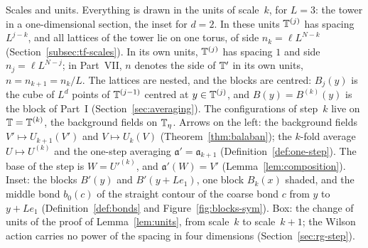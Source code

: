 \begin{gfigure}[tp]
\caption{Scales and units. Everything is drawn in the units of scale~$k$, for $L=3$: the tower in a one-dimensional section, the inset for $d=2$. In these units $\T^{(j)}$ has spacing $L^{j-k}$, and all lattices of the tower lie on one torus, of side $n_k=\ell L^{N-k}$ (Section~\ref{subsec:tf-scales}). In its own units, $\T^{(j)}$ has spacing $1$ and side $n_j=\ell L^{N-j}$; in Part~VII, $n$ denotes the side of $\T'$ in its own units, $n=n_{k+1}=n_k/L$. The lattices are nested, and the blocks are centred: $B_j(y)$ is the cube of $L^d$ points of $\T^{(j-1)}$ centred at $y\in\T^{(j)}$, and $B(y)=B^{(k)}(y)$ is the block of Part~I (Section~\ref{sec:averaging}). The configurations of step~$k$ live on $\T=\T^{(k)}$, the background fields on $\Tf$. Arrows on the left: the background fields $V'\mapsto U_{k+1}(V')$ and $V\mapsto U_k(V)$ (Theorem~\ref{thm:balaban}); the $k$-fold average $U\mapsto U^{(k)}$ and the one-step averaging $\mathfrak a'=\mathfrak a_{k+1}$ (Definition~\ref{def:one-step}). The base of the step is $W=U'^{(k)}$, and $\mathfrak a'(W)=V'$ (Lemma~\ref{lem:composition}). Inset: the blocks $B'(y)$ and $B'(y+Le_1)$, one block $B_k(x)$ shaded, and the middle bond $b_0(c)$ of the straight contour of the coarse bond $c$ from $y$ to $y+Le_1$ (Definition~\ref{def:bonds} and Figure~\ref{fig:blocks-sym}). Box: the change of units of the proof of Lemma~\ref{lem:units}, from scale~$k$ to scale~$k+1$; the Wilson action carries no power of the spacing in four dimensions (Section~\ref{sec:rg-step}).}
\label{fig:G-scales}
\end{gfigure}
